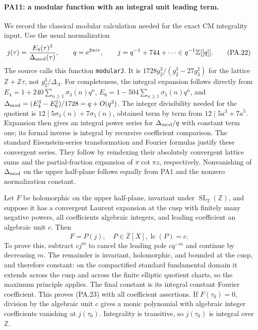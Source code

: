 \paragraph{PA11: a modular function with an integral unit leading term.}
We record the classical modular calculation needed for the exact
CM integrality input. Use the usual normalization
\[
 j(\tau)=\frac{E_4(\tau)^3}{\Delta_{\rm mod}(\tau)},\qquad
 q=e^{2\pi i\tau},\qquad j=q^{-1}+744+\cdots\in q^{-1}\mathbb Z[[q]].
                                                               \tag{PA.22}
\]
The source calls this function \texttt{modularJ}. It is
$1728g_2^3/(g_2^3-27g_3^2)$ for the lattice
$\mathbb Z+\mathbb Z\tau$, not $g_2^3/\Delta_\Lambda$.
For completeness, the integral expansion follows directly from
$E_4=1+240\sum_{n\ge1}\sigma_3(n)q^n$,
$E_6=1-504\sum_{n\ge1}\sigma_5(n)q^n$, and
$\Delta_{\rm mod}=(E_4^3-E_6^2)/1728=q+O(q^2)$.
The integer divisibility needed for the quotient is
$12\mid5\sigma_3(n)+7\sigma_5(n)$, obtained term by term from
$12\mid5a^3+7a^5$. Expansion then gives an integral power
series for $\Delta_{\rm mod}/q$ with constant term one; its
formal inverse is integral by recursive coefficient comparison.
The standard Eisenstein-series transformation and Fourier
formulas justify these convergent series. They follow by
reindexing their absolutely convergent lattice sums and the
partial-fraction expansion of $\pi\cot\pi z$, respectively.
Nonvanishing of $\Delta_{\rm mod}$ on the upper half-plane
follows equally from PA1 and the nonzero normalization constant.

Let $F$ be holomorphic on the upper half-plane, invariant under
$\operatorname{SL}_2(\mathbb Z)$, and suppose it has a convergent
Laurent expansion at the cusp with finitely many negative powers,
all coefficients algebraic integers, and leading coefficient an
algebraic unit $c$. Then
\[
                       F=P(j),\quad P\in\overline{\mathbb Z}[X],
                       \operatorname{lc}(P)=c.                 \tag{PA.23}
\]
To prove this, subtract $c j^m$ to cancel the leading pole
$c q^{-m}$ and continue by decreasing $m$. The remainder is
invariant, holomorphic, and bounded at the cusp, and therefore
constant: on the compactified standard fundamental domain it
extends across the cusp and across the finite elliptic quotient
charts, so the maximum principle applies. The final constant is
its integral constant Fourier coefficient. This proves (PA.23)
with all coefficient assertions. If $F(\tau_0)=0$, division by
the algebraic unit $c$ gives a monic polynomial with algebraic
integer coefficients vanishing at $j(\tau_0)$. Integrality is
transitive, so $j(\tau_0)$ is integral over $\mathbb Z$.


